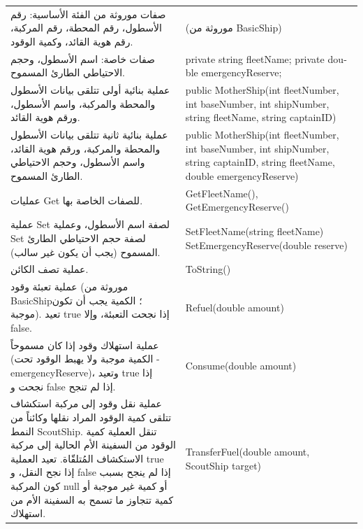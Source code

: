 \documentclass[14pt]{extarticle}
\begin{document}
\begin{enumerate}[resume, label=\textbf{تمرين \arabic*:}, wide=0pt, leftmargin=*, itemsep=2.2em]
    {\centering
    \renewcommand{\arraystretch}{1.2}
    \small
    \begin{tabular}{|>{\raggedleft\arraybackslash}p{}|>{\raggedright\arraybackslash}p{}|}
    \hline
    \multicolumn{2}{|c|}{\textbf{الفئة الفرعية: \textenglish{MotherShip : BasicShip}}} \\
    \hline
    صفات موروثة من الفئة الأساسية: رقم الأسطول، رقم المحطة، رقم المركبة، رقم هوية القائد، وكمية الوقود. & \textenglish{(موروثة من BasicShip)} \\
    \hline
    صفات خاصة: اسم الأسطول، وحجم الاحتياطي الطارئ المسموح. & \textenglish{private string fleetName;} \newline \textenglish{private double emergencyReserve;} \\
    \hline
    عملية بنائية أولى تتلقى بيانات الأسطول والمحطة والمركبة، واسم الأسطول، ورقم هوية القائد. & \textenglish{public MotherShip(int fleetNumber, int baseNumber, int shipNumber, string fleetName, string captainID)} \\
    \hline
    عملية بنائية ثانية تتلقى بيانات الأسطول والمحطة والمركبة، ورقم هوية القائد، واسم الأسطول، وحجم الاحتياطي الطارئ المسموح. & \textenglish{public MotherShip(int fleetNumber, int baseNumber, int shipNumber, string captainID, string fleetName, double emergencyReserve)} \\
    \hline
    عمليات \textenglish{Get} للصفات الخاصة بها. & \textenglish{GetFleetName(), GetEmergencyReserve()} \\
    \hline
    عملية \textenglish{Set} لصفة اسم الأسطول، وعملية \textenglish{Set} لصفة حجم الاحتياطي الطارئ المسموح (يجب أن يكون غير سالب). & \textenglish{SetFleetName(string fleetName)} \newline \textenglish{SetEmergencyReserve(double reserve)} \\
    \hline
    عملية تصف الكائن. & \textenglish{ToString()} \\
    \hline
    عملية تعبئة وقود (موروثة من \textenglish{BasicShip}؛ الكمية يجب أن تكون موجبة). تعيد \textenglish{true} إذا نجحت التعبئة، وإلا \textenglish{false}. & \textenglish{Refuel(double amount)} \\
    \hline
    عملية استهلاك وقود إذا كان مسموحاً (الكمية موجبة ولا يهبط الوقود تحت \textenglish{-emergencyReserve})، وتعيد \textenglish{true} إذا نجحت و \textenglish{false} إذا لم تنجح. & \textenglish{Consume(double amount)} \\
    \hline
    عملية نقل وقود إلى مركبة استكشاف تتلقى كمية الوقود المراد نقلها وكائناً من النمط \textenglish{ScoutShip}. تنقل العملية كمية الوقود من السفينة الأم الحالية إلى مركبة الاستكشاف المُتلقّاة. تعيد العملية \textenglish{true} إذا نجح النقل، و \textenglish{false} إذا لم ينجح بسبب كون المركبة \textenglish{null} أو كمية غير موجبة أو كمية تتجاوز ما تسمح به السفينة الأم من استهلاك. & \textenglish{TransferFuel(double amount, ScoutShip target)} \\
    \hline
    \end{tabular}
    \par} %


\end{enumerate}
\end{document}
